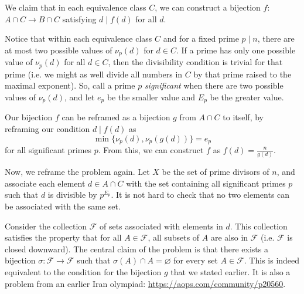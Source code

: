 \documentclass[11pt]{scrartcl}
\begin{document}
We claim that in each equivalence class $C$, we can
construct a bijection $f$: $A \cap C \to B \cap C$
satisfying $d \mid f(d)$ for all $d$.

Notice that within each equivalence class $C$ and for a fixed prime $p \mid n$,
there are at most two possible values of $\nu_p(d)$ for $d \in C$. If
a prime has only one possible value of $\nu_p(d)$ for all $d \in C$,
then the divisibility condition is trivial for that prime (i.e. we might as well divide
all numbers in $C$ by that prime raised to the maximal exponent).
So, call a prime $p$ \textit{significant} when there are two possible values of $\nu_p(d)$,
and let $e_p$ be the smaller value and $E_p$ be the greater value.

Our bijection $f$ can be reframed as a bijection $g$ from $A \cap C$ to itself,
by reframing our condition $d \mid f(d)$ as
\[ \min\{\nu_p(d), \nu_p(g(d))\} = e_p \]
for all significant primes $p$.
From this, we can construct $f$ as $f(d) = \frac{n}{g(d)}$.

Now, we reframe the problem again. Let $X$ be the set of prime divisors of $n$,
and associate each element $d \in A \cap C$ with the set containing
all significant primes $p$ such that $d$ is divisible by $p^{E_p}$.
It is not hard to check that no two elements can be associated with the same set.

Consider the collection $\mathcal F$ of sets associated with elements
in $d$. This collection satisfies the property that for all $A \in \mathcal F$,
all subsets of $A$ are also in $\mathcal F$ (i.e. $\mathcal F$ is closed downward).
The central claim of the problem is that there exists a bijection
$\sigma: \mathcal F \to \mathcal F$ such that $\sigma(A) \cap A = \varnothing$
for every set $A \in \mathcal F$. This is indeed equivalent to the condition
for the bijection $g$ that we stated earlier. It is also a problem
from an earlier Iran olympiad: \url{https://aops.com/community/p20560}.
\end{document}
